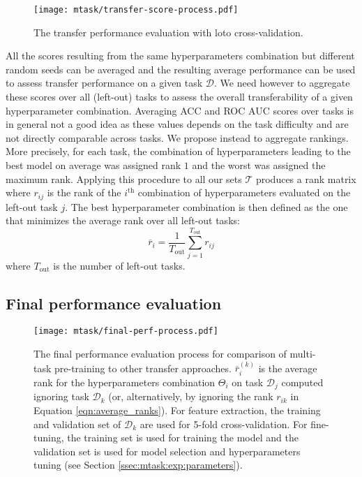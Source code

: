 \begin{figure}
    \centering
    \texttt{[image: mtask/transfer-score-process.pdf]}
    \caption{The transfer performance evaluation with \acrshort{loto} cross-validation.}
    \label{fig:mtask:transfer-score-process}
\end{figure}

All the scores resulting from the same hyperparameters combination but different random seeds can be averaged and the resulting average performance can be used to assess transfer performance on a given task $\mathcal{D}$. We need however to aggregate these scores over all (left-out) tasks to assess the overall transferability of a given hyperparameter combination. Averaging ACC and ROC AUC scores over tasks is in general not a good idea as these values depends on the task difficulty and are not directly comparable across tasks. We propose instead to aggregate rankings. More precisely, for each task, the combination of hyperparameters leading to the best model on average was assigned rank $1$ and the worst was assigned the maximum rank. Applying this procedure to all our sets $\mathcal{T}$ produces a rank matrix where $r_{ij}$ is the rank of the $i^{\text{th}}$ combination of hyperparameters evaluated on the left-out task $j$. The best hyperparameter combination is then defined as the one that minimizes the average rank over all left-out tasks:
\begin{equation} \label{eqn:average_ranks}
\overline{r}_i = \dfrac{1}{T_{\text{out}}} \sum^{T_{\text{out}}}_{j = 1} r_{ij}
\end{equation}
where $T_{\text{out}}$ is the number of left-out tasks.

\subsection{Final performance evaluation}
\label{ssec:mtask:exp:model_eval}

\begin{figure}
    \centering
    \texttt{[image: mtask/final-perf-process.pdf]}
    \caption{The final performance evaluation process for comparison of multi-task pre-training to other transfer approaches. $\overline{r}^{(k)}_i$ is the average rank for the hyperparameters combination $\Theta_i$ on task $\mathcal{D}_j$ computed ignoring task $\mathcal{D}_k$ (or, alternatively, by ignoring the rank $r_{ik}$ in Equation \ref{eqn:average_ranks}). For feature extraction, the training and validation set of $\mathcal{D}_k$ are used for 5-fold cross-validation. For fine-tuning, the training set is used for training the model and the validation set is used for model selection and hyperparameters tuning (see Section \ref{ssec:mtask:exp:parameters}).}
    \label{fig:mtask:final-perf-process}
\end{figure}

